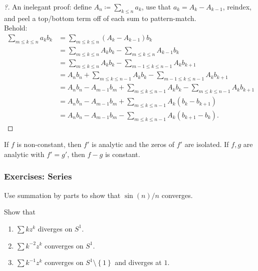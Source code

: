 \begin{proof}[?]

An inelegant proof: define \(A_n \coloneqq\sum_{k\leq n} a_k\), use that
\(a_k = A_k - A_{k-1}\), reindex, and peel a top/bottom term off of each
sum to pattern-match.\\

Behold:
\begin{align*}
\sum_{m\leq k \leq n} a_k b_k 
&= \sum_{m\leq k \leq n} (A_k - A_{k-1}) b_k \\
&= \sum_{m\leq k \leq n} A_kb_k - \sum_{m\leq k \leq n} A_{k-1} b_k \\
&= \sum_{m\leq k \leq n} A_kb_k - \sum_{m-1\leq k \leq n-1} A_{k} b_{k+1} \\
&= A_nb_n + \sum_{m\leq k \leq n-1} A_kb_k - \sum_{m-1\leq k \leq n-1} A_{k} b_{k+1} \\
&= A_nb_n - A_{m-1} b_{m} + \sum_{m\leq k \leq n-1} A_kb_k - \sum_{m\leq k \leq n-1} A_{k} b_{k+1} \\
&= A_nb_n - A_{m-1} b_{m} + \sum_{m\leq k \leq n-1} A_k(b_k - b_{k+1}) \\
&= A_nb_n - A_{m-1} b_{m} - \sum_{m\leq k \leq n-1} A_k(b_{k+1} - b_{k}) 
.\end{align*}

\end{proof}

\begin{proposition}[?]

If \(f\) is non-constant, then \(f'\) is analytic and the zeros of
\(f'\) are isolated. If \(f,g\) are analytic with \(f'=g'\), then
\(f-g\) is constant.

\end{proposition}

\hypertarget{exercises-series}{%
\subsubsection{Exercises: Series}\label{exercises-series}}

\begin{exercise}

Use summation by parts to show that \(\sin(n)/n\) converges.

\end{exercise}

\begin{exercise}

Show that

\begin{enumerate}
\def\labelenumi{\arabic{enumi}.}
\tightlist
\item
  \(\sum kz^k\) diverges on \(S^1\).
\item
  \(\sum k^{-2} z^k\) converges on \(S^1\).
\item
  \(\sum k^{-1}z^k\) converges on \(S^1\setminus\left\{{1}\right\}\) and
  diverges at \(1\).
\end{enumerate}

\end{exercise}

